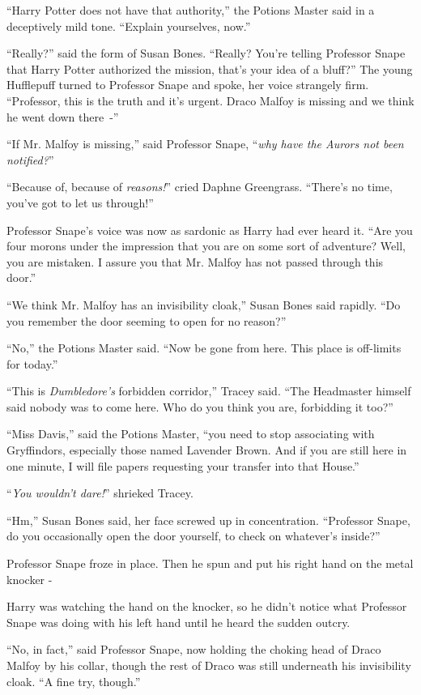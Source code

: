 ``Harry Potter does not have that authority,'' the Potions Master said in a deceptively mild tone. ``Explain yourselves, now.''

``Really?'' said the form of Susan Bones. ``Really? You're telling Professor Snape that Harry Potter authorized the mission, that's your idea of a bluff?'' The young Hufflepuff turned to Professor Snape and spoke, her voice strangely firm. ``Professor, this is the truth and it's urgent. Draco Malfoy is missing and we think he went down there~-''

``If Mr. Malfoy is missing,'' said Professor Snape, ``\emph{why have the Aurors not been notified?}''

``Because of, because of \emph{reasons!}'' cried Daphne Greengrass. ``There's no time, you've got to let us through!''

Professor Snape's voice was now as sardonic as Harry had ever heard it. ``Are you four morons under the impression that you are on some sort of adventure? Well, you are mistaken. I assure you that Mr. Malfoy has not passed through this door.''

``We think Mr. Malfoy has an invisibility cloak,'' Susan Bones said rapidly. ``Do you remember the door seeming to open for no reason?''

``No,'' the Potions Master said. ``Now be gone from here. This place is off-limits for today.''

``This is \emph{Dumbledore's} forbidden corridor,'' Tracey said. ``The Headmaster himself said nobody was to come here. Who do you think you are, forbidding it too?''

``Miss Davis,'' said the Potions Master, ``you need to stop associating with Gryffindors, especially those named Lavender Brown. And if you are still here in one minute, I will file papers requesting your transfer into that House.''

``\emph{You wouldn't dare!}'' shrieked Tracey.

``Hm,'' Susan Bones said, her face screwed up in concentration. ``Professor Snape, do you occasionally open the door yourself, to check on whatever's inside?''

Professor Snape froze in place. Then he spun and put his right hand on the metal knocker -

Harry was watching the hand on the knocker, so he didn't notice what Professor Snape was doing with his left hand until he heard the sudden outcry.

``No, in fact,'' said Professor Snape, now holding the choking head of Draco Malfoy by his collar, though the rest of Draco was still underneath his invisibility cloak. ``A fine try, though.''

